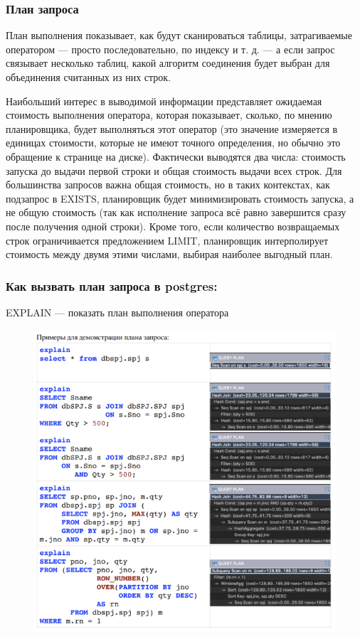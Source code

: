 \subsubsection{План запроса}

План выполнения показывает, как будут сканироваться таблицы,
затрагиваемые оператором — просто последовательно, по индексу и т. д.
— а если запрос связывает несколько таблиц, какой алгоритм соединения
будет выбран для объединения считанных из них строк.

Наибольший интерес в выводимой информации представляет ожидаемая
стоимость
выполнения оператора, которая показывает, сколько, по мнению
планировщика, будет
выполняться этот оператор (это значение измеряется в единицах
стоимости, которые не
имеют точного определения, но обычно это обращение к странице на диске). Фактически
выводятся два числа: стоимость запуска до выдачи первой строки и общая
стоимость выдачи всех строк. Для большинства запросов важна общая
стоимость, но в таких контекстах, как подзапрос в EXISTS, планировщик
будет минимизировать стоимость запуска, а не общую стоимость (так как
исполнение запроса всё равно завершится сразу после получения одной
строки). Кроме того, если количество возвращаемых строк ограничивается
предложением LIMIT, планировщик интерполирует стоимость между двумя
этими числами, выбирая наиболее выгодный план.

\subsubsection{Как вызвать план запроса в postgres:}

EXPLAIN — показать план выполнения оператора

\begin{figure}[ht!]
	\centering
	\includegraphics[width=18cm, keepaspectratio]{assets/plan-2.png}
	\caption{} 
\end{figure}
\FloatBarrier
